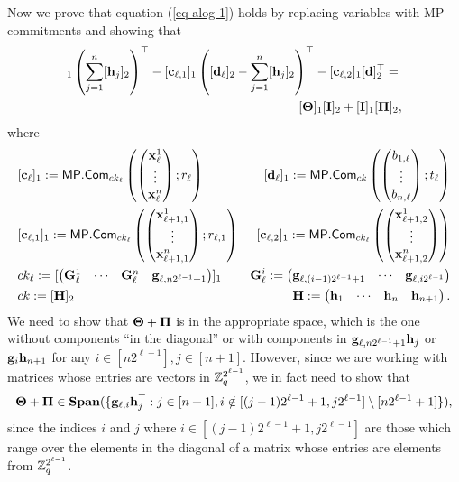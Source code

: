 Now we prove that equation (\ref{eq-alog-1}) holds by replacing variables with MP commitments and showing that
\begin{align*}
[\vecb{c}_\ell]_1\left(\sum_{j=1}^n[\vecb{h}_j]_2\right)^\top-[\vecb{c}_{\ell,1}]_1\left([\vecb{d}_\ell]_2-\sum_{j=1}^n[\vecb{h}_j]_2\right)^\top-[\vecb{c}_{\ell,2}]_1[\vecb{d}]_2^\top
=&\\
[\matr{\Theta}]_1[\matr{I}]_2+[\matr{I}]_1[\matr{\Pi}]_2&,
\end{align*}
where
\begin{align*}
&[\mathbf{c}_\ell]_1:=\mathsf{MP}.\mathsf{Com}_{ck_\ell}\left(\left(\begin{matrix}\mathbf{x}^1_\ell\\\vdots\\\mathbf{x}^n_\ell\end{matrix}\right);r_\ell\right)
&[\mathbf{d}_\ell]_1:=\mathsf{MP}.\mathsf{Com}_{ck}\left(\left(\begin{matrix}b_{1,\ell}\\\vdots\\b_{n,\ell}\end{matrix}\right);t_\ell\right)\\
&[\mathbf{c}_{\ell,1}]_1:=\mathsf{MP}.\mathsf{Com}_{ck_\ell}\left(\left(\begin{matrix}\mathbf{x}^1_{\ell+1,1}\\\vdots\\\mathbf{x}^n_{\ell+1,1}\end{matrix}\right);r_{\ell,1}\right)
&[\mathbf{c}_{\ell,2}]_1:=\mathsf{MP}.\mathsf{Com}_{ck_\ell}\left(\left(\begin{matrix}\mathbf{x}^1_{\ell+1,2}\\\vdots\\\mathbf{x}^n_{\ell+1,2}\end{matrix}\right)\right)\\
&ck_\ell:=[\left(\begin{matrix}\mathbf{{G}}_{\ell}^{1}&\cdots&\mathbf{{G}}_{\ell}^{n} & \mathbf{g}_{\ell,n2^{\ell-1}+1}\end{matrix}\right)]_1
&\mathbf{{G}}_{\ell}^{i}:=\left(\begin{matrix}\mathbf{g}_{\ell,(i-1)2^{\ell-1}+1}&\cdots&\mathbf{g}_{\ell,i2^{\ell-1}}\end{matrix}\right)\\
&ck:=[\mathbf{{H}}]_2 &
\mathbf{{H}}:=\left(\begin{matrix}\mathbf{h}_1&\cdots&\mathbf{h}_n&\mathbf{h}_{n+1}\end{matrix}\right).
\end{align*}
We need to show that $\mathbf{{\Theta}}+\mathbf{{\Pi}}$ is in the appropriate space, which is the one without components ``in the diagonal'' or with components in $\mathbf{g}_{\ell,n2^{\ell-1}+1}\mathbf{h}_j$ or $\mathbf{g}_i\mathbf{h}_{n+1}$ for any $i\in[n2^{\ell-1}],j\in[n+1]$. However, since we are working with matrices whose entries are vectors in $\mathbb{Z}_q^{2^{\ell-1}}$, we in fact need to show that
$$
\mathbf{{\Theta}}+\mathbf{{\Pi}}\in\mathbf{Span}(\{\mathbf{g}_{\ell,i}\mathbf{h}_j^\top:j\in[n+1],i\notin[(j-1)2^{\ell-1}+1,j2^{\ell-1}]\setminus[n2^{\ell-1}+1]\}),
$$
since the indices $i$ and $j$ where $i\in[(j-1)2^{\ell-1}+1,j2^{\ell-1}]$ are those which range over the elements in the diagonal of a matrix whose entries are elements from $\mathbb{Z}_q^{2^{\ell-1}}$.


